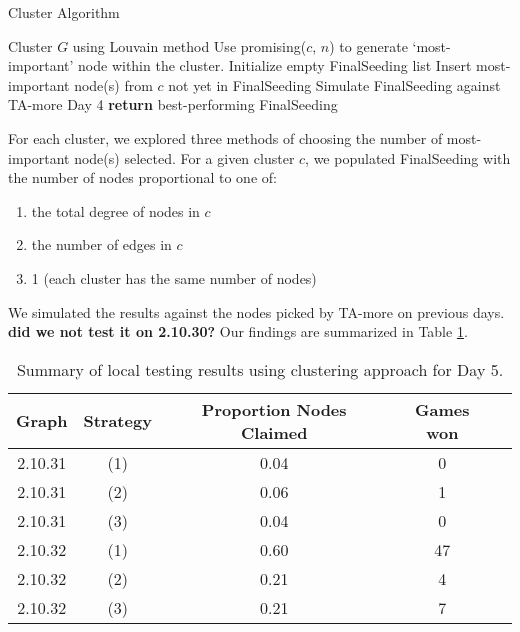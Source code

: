 \documentclass[letterpaper, 11pt]{article}
\begin{document}
\begin{algorithm}
\caption{Cluster Algorithm}
\begin{algorithmic}[1]
\State Cluster $G$ using Louvain method
\State Use promising($c$, $n$) to generate `most-important' node within the cluster.
\EndFor
{}
\State Initialize empty FinalSeeding list
\State Insert most-important node(s) from $c$ not yet in FinalSeeding
\EndFor
\State Simulate FinalSeeding against TA-more Day 4
\EndWhile
\EndFor
\State \textbf{return} best-performing FinalSeeding
\EndProcedure
\end{algorithmic}
\label{alg:cluster}
\end{algorithm}

\noindent For each cluster, we explored three methods of choosing the number of most-important node(s) selected. For a given cluster $c$, we populated FinalSeeding with the number of nodes proportional to one of:
\begin{enumerate}[label=(\arabic*)]
\item the total degree of nodes in $c$
\item the number of edges in $c$
\item 1 (each cluster has the same number of nodes)
\end{enumerate}

We simulated the results against the nodes picked by TA-more on previous days. \textbf{did we not test it on 2.10.30?} Our findings are summarized in Table \ref{table:day5}.
\begin{table}[h!]\centering
\begin{tabular}{ccccc}
Graph & Strategy & Proportion Nodes Claimed & Games won \\ \hline
\toprule
2.10.31 & (1) & 0.04 & 0 \\
2.10.31 & (2) & 0.06 & 1 \\
2.10.31 & (3) & 0.04 & 0 \\
\midrule

2.10.32 & (1) & 0.60 & 47 \\
2.10.32 & (2) & 0.21 & 4 \\
2.10.32 & (3) & 0.21 & 7 \\
\midrule
\bottomrule
\end{tabular}
\caption{Summary of local testing results using clustering approach for Day 5.}
\label{table:day5}
\end{table}
\end{document}
